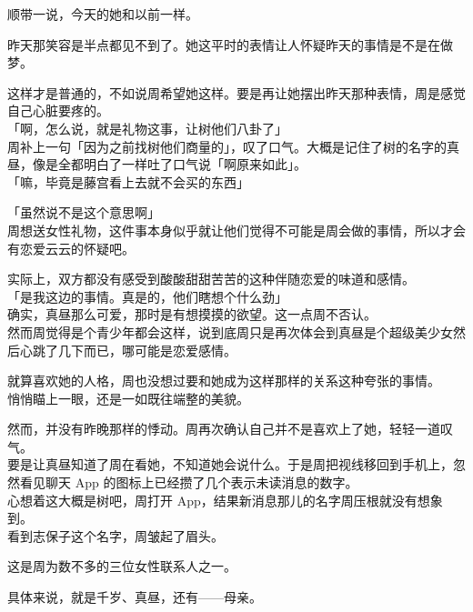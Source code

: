 顺带一说，今天的她和以前一样。

昨天那笑容是半点都见不到了。她这平时的表情让人怀疑昨天的事情是不是在做梦。

这样才是普通的，不如说周希望她这样。要是再让她摆出昨天那种表情，周是感觉自己心脏要疼的。\\

「啊，怎么说，就是礼物这事，让树他们八卦了」\\

周补上一句「因为之前找树他们商量的」，叹了口气。大概是记住了树的名字的真昼，像是全都明白了一样吐了口气说「啊原来如此」。\\

「嘛，毕竟是藤宫看上去就不会买的东西」

「虽然说不是这个意思啊」\\

周想送女性礼物，这件事本身似乎就让他们觉得不可能是周会做的事情，所以才会有恋爱云云的怀疑吧。

实际上，双方都没有感受到酸酸甜甜苦苦的这种伴随恋爱的味道和感情。\\

「是我这边的事情。真是的，他们瞎想个什么劲」\\

确实，真昼那么可爱，那时是有想摸摸的欲望。这一点周不否认。\\

然而周觉得是个青少年都会这样，说到底周只是再次体会到真昼是个超级美少女然后心跳了几下而已，哪可能是恋爱感情。

就算喜欢她的人格，周也没想过要和她成为这样那样的关系这种夸张的事情。\\

悄悄瞄上一眼，还是一如既往端整的美貌。

然而，并没有昨晚那样的悸动。周再次确认自己并不是喜欢上了她，轻轻一道叹气。\\

要是让真昼知道了周在看她，不知道她会说什么。于是周把视线移回到手机上，忽然看见聊天 App 的图标上已经攒了几个表示未读消息的数字。\\

心想着这大概是树吧，周打开 App，结果新消息那儿的名字周压根就没有想象到。\\

看到志保子这个名字，周皱起了眉头。

这是周为数不多的三位女性联系人之一。

具体来说，就是千岁、真昼，还有——母亲。\\

